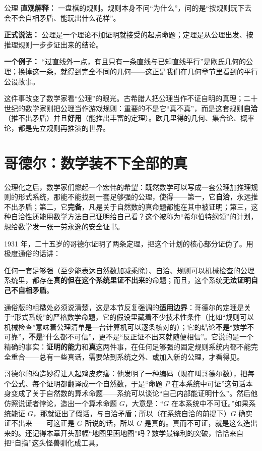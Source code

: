\begin{shuyu}{公理}
\textbf{直观解释：} 一盘棋的规则。规则本身不问“为什么”，问的是“按规则玩下去会不会自相矛盾、能玩出什么花样”。

\textbf{正式说法：} 公理是一个理论不加证明就接受的起点命题；定理是从公理出发、按推理规则一步步证出来的结论。

\textbf{一个例子：} “过直线外一点，有且只有一条直线与已知直线平行”是欧氏几何的公理；换掉这一条，就得到完全不同的几何——这正是我们在几何章节里看到的平行公设故事。
\end{shuyu}

这件事改变了数学家看“公理”的眼光。古希腊人把公理当作不证自明的真理；二十世纪的数学家则把公理当作游戏规则：重要的不是它“真不真”，而是这套规则\textbf{自洽}（推不出矛盾）并且\textbf{好用}（能推出丰富的定理）。欧几里得的几何、集合论、概率论，都是先立规则再推演的世界。

\section{哥德尔：数学装不下全部的真}

公理化之后，数学家们燃起一个宏伟的希望：既然数学可以写成一套公理加推理规则的形式系统，那能不能找到一套足够强的公理，使得——第一，它\textbf{自洽}，永远推不出矛盾；第二，它\textbf{完备}，凡是关于自然数的真命题都能在其中被证明；第三，这种自洽性还能用数学方法自己证明给自己看？这个被称为“希尔伯特纲领”的计划，想给数学发一张一劳永逸的安全证书。

1931 年，二十五岁的哥德尔证明了两条定理，把这个计划的核心部分证伪了。用极度通俗的话讲：

\begin{dingli}
任何一套足够强（至少能表达自然数加减乘除）、自洽、规则可以机械检查的公理系统里，都存在\textbf{真的但在这个系统里证不出来}的命题；而且，这个系统\textbf{无法证明自己不自相矛盾}。
\end{dingli}

通俗版的粗糙处必须说清楚，这是本节反复强调的\textbf{适用边界}：哥德尔的定理是关于“形式系统”的严格数学命题，它的假设里藏着不少技术性条件（比如“规则可以机械检查”意味着公理清单是一台计算机可以逐条核对的）；它的结论\textbf{不是}“数学不可靠”，\textbf{不是}“什么都不可信”，更不是“反正证不出来就随便相信”。它说的是一个精确的事实：\textbf{证明的能力}和\textbf{真}这两件事，在任何足够强的固定规则系统内都不能完全重合——总有一些真话，需要站到系统之外、或加入新的公理，才看得见。

哥德尔的构造妙得让人起鸡皮疙瘩：他发明了一种编码（现在叫哥德尔数），把每个公式、每个证明都翻译成一个自然数，于是“命题 $P$ 在本系统中可证”这句话本身变成了关于自然数的算术命题——系统可以谈论“自己内部能证明什么”。然后他仿照说谎者悖论，造出一个算术命题 $G$，大意是：“$G$ 在本系统中不可证。”如果系统能证 $G$，那就证出了假话，与自洽矛盾；所以（在系统自洽的前提下）$G$ 确实证不出来——可这正是 $G$ 所说的话，所以 $G$ 是真的。真而不可证，就是这么造出来的。还记得本章开头那幅“地图里画地图”吗？数学最锋利的突破，恰恰来自把“自指”这头怪兽驯化成工具。

